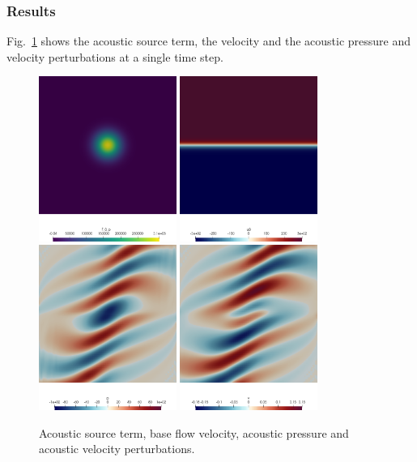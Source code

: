 \subsubsection{Results}
Fig.~\ref{f:acousticsolver:results} shows the acoustic source term, the velocity and the acoustic pressure and velocity perturbations at a single time step.
\begin{figure}
	\centering
	\includegraphics[width=0.4\textwidth]{img/Acoustics_F_0_p.png} \hfill%
	\includegraphics[width=0.4\textwidth]{img/Acoustics_u0.png}
    \vspace{5mm}\\%
	\includegraphics[width=0.4\textwidth]{img/Acoustics_p.png} \hfill%
	\includegraphics[width=0.4\textwidth]{img/Acoustics_v.png}
	\caption{Acoustic source term, base flow velocity, acoustic pressure and acoustic velocity perturbations.}
	\label{f:acousticsolver:results}
\end{figure}


